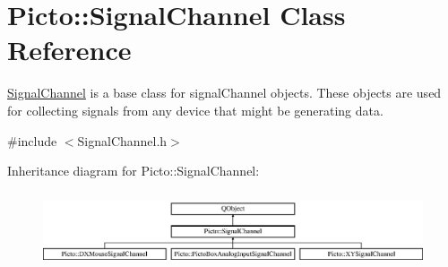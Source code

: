 \hypertarget{class_picto_1_1_signal_channel}{\section{Picto\-:\-:Signal\-Channel Class Reference}
\label{class_picto_1_1_signal_channel}
}


\hyperlink{class_picto_1_1_signal_channel}{Signal\-Channel} is a base class for signal\-Channel objects. These objects are used for collecting signals from any device that might be generating data.  




{\ttfamily \#include $<$Signal\-Channel.\-h$>$}

Inheritance diagram for Picto\-:\-:Signal\-Channel\-:\begin{figure}[H]
\begin{center}
\leavevmode
\includegraphics[height=2.222222cm]{class_picto_1_1_signal_channel}
\end{center}
\end{figure}
